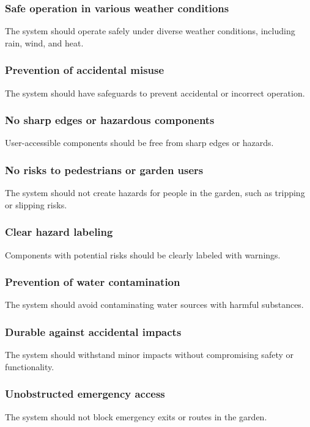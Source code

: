 \documentclass[12pt]{report}
\begin{document}
\subsubsection{Safe operation in various weather conditions}
The system should operate safely under diverse weather conditions, including rain, wind, and heat.

\subsubsection{Prevention of accidental misuse}
The system should have safeguards to prevent accidental or incorrect operation.

\subsubsection{No sharp edges or hazardous components}
User-accessible components should be free from sharp edges or hazards.

\subsubsection{No risks to pedestrians or garden users}
The system should not create hazards for people in the garden, such as tripping or slipping risks.

\subsubsection{Clear hazard labeling}
Components with potential risks should be clearly labeled with warnings.

\subsubsection{Prevention of water contamination}
The system should avoid contaminating water sources with harmful substances.

\subsubsection{Durable against accidental impacts}
The system should withstand minor impacts without compromising safety or functionality.

\subsubsection{Unobstructed emergency access}
The system should not block emergency exits or routes in the garden.
\end{document}
